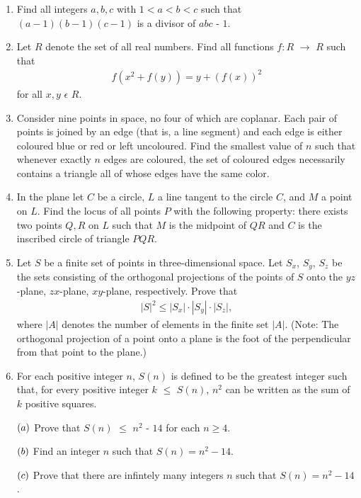 \documentclass{article}
\begin{document}
\begin{enumerate}

\item  Find all integers $a,b,c$ with $1 < a < b < c$ such that
$(a-1)(b-1)(c-1)$ is a divisor of $abc$ - $1$.

\item Let ${R}$ denote the set of all real numbers. Find all functions $f : {R}$ $\rightarrow$ ${R}$ such that
\begin{align*}
f(x^{2}+f(y))=y+(f(x))^{2}  
\end{align*}
for all $x, y$ $\epsilon$ $R$.
\item Consider nine points in space, no four of which are coplanar. Each pair of points is joined by an edge (that is, a line segment) and each edge is either coloured blue or red or left uncoloured. Find the smallest value of $n$ such that whenever exactly $n$ edges are coloured, the set of coloured edges necessarily contains a triangle all of whose edges have the same color.

\item In the plane let $C$ be a circle, $L$ a line tangent to the circle $C$, and $M$ a point on $L$. Find the locus of all points $P$ with the following property: there exists two points $Q,R$ on $L$ such that $M$ is the midpoint of $QR$ and $C$ is the inscribed circle of triangle $PQR$.

\item Let $S$ be a finite set of points in three-dimensional space. Let $S_x$, $S_y$, $S_z$ be the sets consisting of the orthogonal projections of the points of $S$ onto the $yz$-plane, $zx$-plane, $xy$-plane, respectively. Prove that
\begin{align*}
|S|^{2} \leq |S_x| \cdot |S_y| \cdot |S_z|,
\end{align*}
where $|A|$ denotes the number of elements in the finite set $|A|$. (Note: The orthogonal projection of a point onto a plane is the foot of the perpendicular from that point to the plane.)

\item For each positive integer $n$, $S(n)$ is defined to be the greatest integer such that, for every positive integer $k$ $\leq$ $S(n)$, $n^{2}$ can be written as the sum of $k$ positive squares. 

$\left(a\right)$ Prove that $S(n)$ $\leq$ $n^{2}$ - $14$ for each $n \geq 4$. 

$\left(b\right)$ Find an integer $n$ such that $S(n)=n^{2}-14$.

$\left(c\right)$ Prove that there are infintely many integers $n$ such that $S(n) = {n^{2}}-14$.

\end{enumerate}
\end{document}
